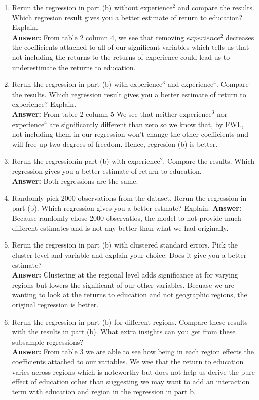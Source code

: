 \documentclass[11pt]{SelfArxOneColBMN}
\begin{document}
\begin{enumerate}
\begin{enumerate}[label=(\alph*)]
    \item Rerun the regression in part (b) without $\text{experience}^2$ and compare the results. Which regresion result gives you a better estimate of return to education? Explain.\\
    \textbf{Answer: }From table 2 column 4, we see that removing $experience^2$ decreases the coefficients attached to all of our significant variables which tells us that not including the returns to the returns of experience could lead us to underestimate the returns to education.
    \item Rerun the regression in part (b) with $\text{experience}^3$ and $\text{experience}^4$. Compare the results. Which regression result gives you a better estimate of return to experience? Explain.\\
    \textbf{Answer: }From table 2 column 5 We see that neither $\text{experience}^3$ nor $\text{experience}^4$ are significantly different than zero so we know that, by FWL, not including them in our regression won't change the other coefficients and will free up two degrees of freedom. Hence, regresion (b) is better.
    \item Rerun the regressionin part (b) with $\text{experience}^2$. Compare the results. Which regression gives you a better estimate of return to education.\\
    \textbf{Answer: }Both regressions are the same.
    \item Randomly pick 2000 observations from the dataset. Rerun the regression in part (b). Which regression gives you a better estmate? Explain.
    \textbf{Answer: }Because randomly chose 2000 observatios, the model to not provide much different estimates and is not any better than what we had originally.
    \item Rerun the regression in part (b) with clustered standard errors. Pick the cluster level and variable and explain your choice. Does it give you a better estimate?\\
    \textbf{Answer: }Clustering at the regional level adds significance at for varying regions but lowers the significant of our other variables. Becuase we are wanting to look at the returns to education and not geographic regions, the original regression is better.
    \item Rerun the regression in part (b) for different regions. Compare these results with the results in part (b). What extra insights can you get from these subsample regressions?\\
    \textbf{Answer: }From table 3 we are able to see how being in each region effects the coefficients attached to our variables. We wee that the return to education varies across regions which is noteworthy but does not help us derive the pure effect of education other than suggesting we may want to add an interaction term with education and region in the regression in part b.

\end{enumerate}
\end{enumerate}
\end{document}
